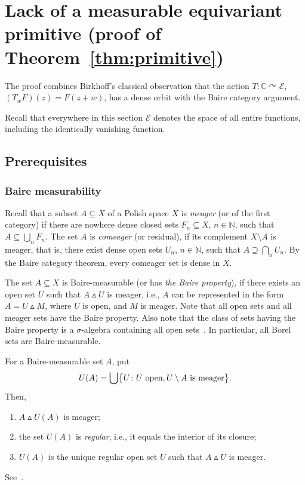 \documentclass[11pt]{paper}
\newcommand{\bC}{\mathbb C}
\newcommand{\bN}{\mathbb N}
\newcommand{\cE}{\mathcal E}
\begin{document}
\section{Lack of a measurable equivariant primitive
(proof of Theorem~\ref{thm:primitive})}\label{sect:primitive}


The proof combines Birkhoff's classical observation that the action $T\colon \bC\curvearrowright\cE$,
$(T_w F)(z)= F(z+w)$, has a dense orbit with the Baire category argument.

Recall that everywhere in this section $\cE$ denotes the space of all entire functions, including
the identically vanishing function.

\subsection{Prerequisites}

\subsubsection{Baire measurability}
Recall that a subset $A\subseteq X$ of a Polish space $X$ is {\em meager} (or of the first category)
if there are nowhere dense closed sets $F_n\subseteq X$, $n\in\bN$, such that $A\subseteq \bigcup_n F_n$.
The set $A$ is {\em comeager} (or residual), if its complement $X\setminus A$
is meager, that is, there exist dense open sets $U_n$, $n\in\bN$, such that $A\supseteq \bigcap_n U_n$.
By the Baire category theorem, every comeager set is dense in $X$.

\smallskip
The set $A\subseteq X$ is Baire-measurable (or has {\em the Baire property}),
if there exists an open set $U$ such that
$A\vartriangle U$ is meager, i.e., $A$ can be represented in the form $A=U\vartriangle M$, where
$U$ is open, and $M$ is meager. Note that all open sets and all meager sets have the Baire property.
Also note that the class of sets having the Baire property is a $\sigma$-algebra containing
all open sets~\cite[8.22]{Kechris}. In particular, all Borel sets are Baire-measurable.

For a Baire-measurable set $A$, put
\[
U(A)=\bigcup \bigl\{U\colon U\ {\rm open}, U\setminus A\ {\rm is\ meager} \bigr\}.
\]
Then,
\begin{enumerate}
\item[(a)] $A\vartriangle U(A)$ is meager;
\item[(b)] the set $U(A)$ is {\em regular}, i.e., it equals the interior of its closure;
\item[(c)] $U(A)$ is the unique regular open set $U$ such that $A\vartriangle U$ is meager.
\end{enumerate}
See~\cite[Theorem~8.29]{Kechris}.
\end{document}
